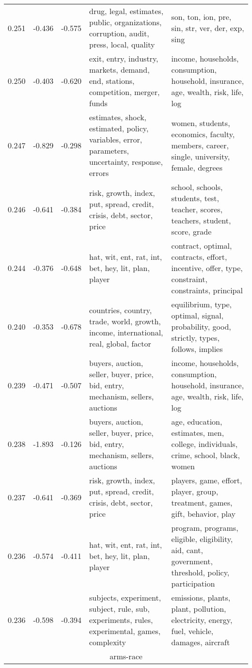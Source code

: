 \begin{tabular}{cccp{5cm}p{5cm}}
0.251 & -0.436 & -0.575 & drug, legal, estimates, public, organizations, corruption, audit, press, local, quality & son, ton, ion, pre, sin, str, ver, der, exp, sing \\
0.250 & -0.403 & -0.620 & exit, entry, industry, markets, demand, end, stations, competition, merger, funds & income, households, consumption, household, insurance, age, wealth, risk, life, log \\
0.247 & -0.829 & -0.298 & estimates, shock, estimated, policy, variables, error, parameters, uncertainty, response, errors & women, students, economics, faculty, members, career, single, university, female, degrees \\
0.246 & -0.641 & -0.384 & risk, growth, index, put, spread, credit, crisis, debt, sector, price & school, schools, students, test, teacher, scores, teachers, student, score, grade \\
0.244 & -0.376 & -0.648 & hat, wit, ent, rat, int, bet, hey, lit, plan, player & contract, optimal, contracts, effort, incentive, offer, type, constraint, constraints, principal \\
0.240 & -0.353 & -0.678 & countries, country, trade, world, growth, income, international, real, global, factor & equilibrium, type, optimal, signal, probability, good, strictly, types, follows, implies \\
0.239 & -0.471 & -0.507 & buyers, auction, seller, buyer, price, bid, entry, mechanism, sellers, auctions & income, households, consumption, household, insurance, age, wealth, risk, life, log \\
0.238 & -1.893 & -0.126 & buyers, auction, seller, buyer, price, bid, entry, mechanism, sellers, auctions & age, education, estimates, men, college, individuals, crime, school, black, women \\
0.237 & -0.641 & -0.369 & risk, growth, index, put, spread, credit, crisis, debt, sector, price & players, game, effort, player, group, treatment, games, gift, behavior, play \\
0.236 & -0.574 & -0.411 & hat, wit, ent, rat, int, bet, hey, lit, plan, player & program, programs, eligible, eligibility, aid, cant, government, threshold, policy, participation \\
0.236 & -0.598 & -0.394 & subjects, experiment, subject, rule, sub, experiments, rules, experimental, games, complexity & emissions, plants, plant, pollution, electricity, energy, fuel, vehicle, damages, aircraft \\
\midrule
\multicolumn{5}{c}{arms-race}\\

\end{tabular}
